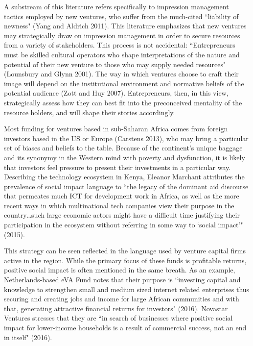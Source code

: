 \documentclass[12pt]{article}
\begin{document}
A substream of this literature refers specifically to impression management tactics employed by new ventures, who suffer from the much-cited ``liability of newness" (Yang and Aldrich 2011). This literature emphasizes that new ventures may strategically draw on impression management in order to secure resources from a variety of stakeholders. This process is not accidental: ``Entrepreneurs must be skilled cultural operators who shape interpretations of the nature and potential of their new venture to those who may supply needed resources" (Lounsbury and Glynn 2001). The way in which ventures choose to craft their image will depend on the institutional environment and normative beliefs of the potential audience (Zott and Huy 2007). Entrepreneurs, then, in this view, strategically assess how they can best fit into the preconceived mentality of the resource holders, and will shape their stories accordingly.

Most funding for ventures based in sub-Saharan Africa comes from foreign investors based in the US or Europe (Carstens 2013), who may bring a particular set of biases and beliefs to the table. Because of the continent's unique baggage and its synonymy in the Western mind with poverty and dysfunction, it is likely that investors feel pressure to present their investments in a particular way. Describing the technology ecosystem in Kenya, Eleanor Marchant attributes the prevalence of social impact language to ``the legacy of the dominant aid discourse that permeates much ICT for development work in Africa, as well as the more recent ways in which multinational tech companies view their purpose in the country…such large economic actors might have a difficult time justifying their participation in the ecosystem without referring in some way to ‘social impact'" (2015).

This strategy can be seen reflected in the language used by venture capital firms active in the region. While the primary focus of these funds is profitable returns, positive social impact is often mentioned in the same breath. As an example, Netherlands-based eVA Fund notes that their purpose is ``investing capital and knowledge to strengthen small and medium sized internet related enterprises thus securing and creating jobs and income for large African communities and with that, generating attractive financial returns for investors" (2016). Novastar Ventures stresses that they are ``in search of businesses where positive social impact for lower-income households is a result of commercial success, not an end in itself" (2016). 
\end{document}
